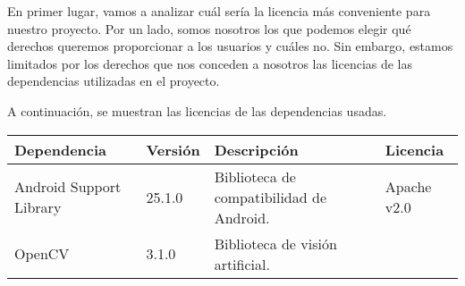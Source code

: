 En primer lugar, vamos a analizar cuál sería la licencia más conveniente
para nuestro proyecto. Por un lado, somos nosotros los que podemos
elegir qué derechos queremos proporcionar a los usuarios y cuáles no.
Sin embargo, estamos limitados por los derechos que nos conceden a
nosotros las licencias de las dependencias utilizadas en el proyecto.

A continuación, se muestran las licencias de las dependencias usadas.

\begin{longtable}[]{@{}llll@{}}
\toprule
\begin{minipage}[b]{0.18\columnwidth}\raggedright\strut
Dependencia\strut
\end{minipage} & \begin{minipage}[b]{0.10\columnwidth}\raggedright\strut
Versión\strut
\end{minipage} & \begin{minipage}[b]{0.49\columnwidth}\raggedright\strut
Descripción\strut
\end{minipage} & \begin{minipage}[b]{0.11\columnwidth}\raggedright\strut
Licencia\strut
\end{minipage}\tabularnewline
\midrule
\endhead
\begin{minipage}[t]{0.18\columnwidth}\raggedright\strut
Android Support Library\strut
\end{minipage} & \begin{minipage}[t]{0.08\columnwidth}\raggedright\strut
25.1.0\strut
\end{minipage} & \begin{minipage}[t]{0.49\columnwidth}\raggedright\strut
Biblioteca de compatibilidad de Android.\strut
\end{minipage} & \begin{minipage}[t]{0.11\columnwidth}\raggedright\strut
Apache v2.0\strut
\end{minipage}\tabularnewline
\begin{minipage}[t]{0.18\columnwidth}\raggedright\strut
OpenCV\strut
\end{minipage} & \begin{minipage}[t]{0.08\columnwidth}\raggedright\strut
3.1.0\strut
\end{minipage} & \begin{minipage}[t]{0.49\columnwidth}\raggedright\strut
Biblioteca de visión artificial.\strut
\end{minipage} & \begin{minipage}[t]{0.11\columnwidth}\raggedright\strut

\end{minipage}
\end{longtable}

